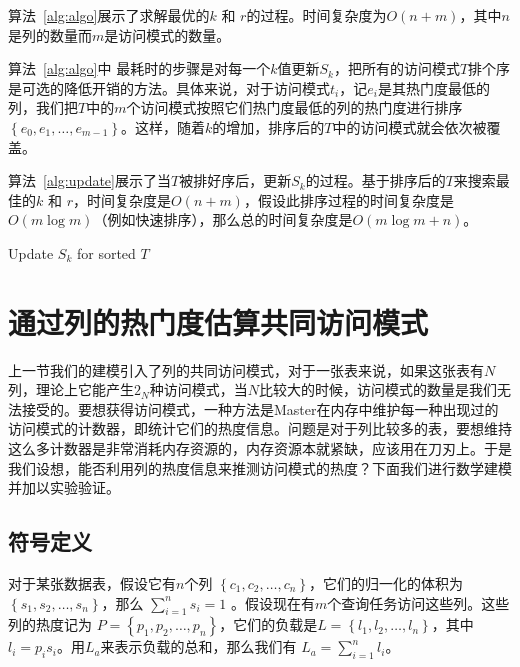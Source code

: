 \par 算法~\ref{alg:algo}展示了求解最优的$k$ 和 $r$的过程。时间复杂度为$O(n + m)$，其中$n$是列的数量而$m$是访问模式的数量。

\par 算法~\ref{alg:algo}中 最耗时的步骤是对每一个$k$值更新$S_k$，把所有的访问模式$T$排个序是可选的降低开销的方法。具体来说，对于访问模式$t_i$，记$e_i$是其热门度最低的列，我们把$T$中的$m$个访问模式按照它们热门度最低的列的热门度进行排序$\left\{e_{0}, e_{1}, \dots, e_{m-1}\right\}$。这样，随着$k$的增加，排序后的$T$中的访问模式就会依次被覆盖。

\par 算法~\ref{alg:update}展示了当$T$被排好序后，更新$S_k$的过程。基于排序后的$T$来搜索最佳的$k$ 和 $r$，时间复杂度是$O(n + m)$，假设此排序过程的时间复杂度是$O(m\log{m})$（例如快速排序），那么总的时间复杂度是$O(m\log{m} + n)$。

\begin{algorithm}[tb]
	\caption{Update $S_k$ for sorted $T$}
	\label{alg:update}
	\small
	\begin{algorithmic}[1]
		\Else
		\State{\Return}
		\EndIf
		\EndFor
		\EndFunction
		
	\end{algorithmic}
\end{algorithm}

\section{通过列的热门度估算共同访问模式}
\label{sec:estimate-patern}
\par 上一节我们的建模引入了列的共同访问模式，对于一张表来说，如果这张表有$N$列，理论上它能产生$2_N$种访问模式，当$N$比较大的时候，访问模式的数量是我们无法接受的。要想获得访问模式，一种方法是Master在内存中维护每一种出现过的访问模式的计数器，即统计它们的热度信息。问题是对于列比较多的表，要想维持这么多计数器是非常消耗内存资源的，内存资源本就紧缺，应该用在刀刃上。于是我们设想，能否利用列的热度信息来推测访问模式的热度？下面我们进行数学建模并加以实验验证。

\subsection{符号定义}

\par 对于某张数据表，假设它有$n$个列 $\left\{ c_{1}, c_{2}, \dots ,c_{n} \right\} $，它们的归一化的体积为$\left\{ s_{1}, s_{2}, \dots ,s_{n} \right\} $，那么 $\sum_{i=1}^{n}s_i = 1$ 。假设现在有$m$个查询任务访问这些列。这些列的热度记为 $ P = \left\{ p_{1}, p_{2}, \dots, p_{n} \right\} $，它们的负载是$ L = \left\{ l_{1}, l_{2}, \dots, l_{n} \right\} $，其中 $l_i = p_i s_i$。用$L_a$来表示负载的总和，那么我们有 $L_a = \sum_{i=1}^{n}l_i$。

